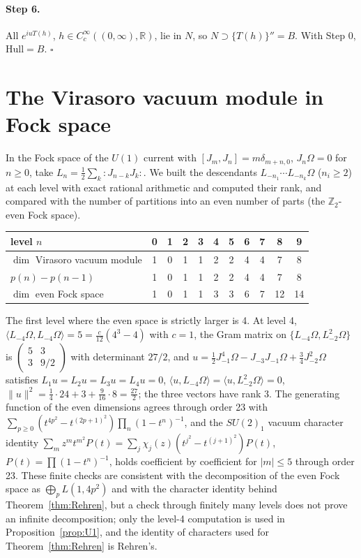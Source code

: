 \documentclass[12pt]{article}
\theoremstyle{definition}
\theoremstyle{remark}
\begin{document}
\paragraph{Step 6.} All \(e^{iuT(h)}\), \(h\in C_c^\infty((0,\infty),\mathbb R)\), lie in \(N\), so
\(N\supset\{T(h)\}''=B\). With Step 0, \(\mathrm{Hull}=B\). \(\square\)

\section{The Virasoro vacuum module in Fock space}\label{app:fock}

In the Fock space of the \(U(1)\) current with \([J_m,J_n]=m\delta_{m+n,0}\),
\(J_n\Omega=0\) for \(n\ge0\), take \(L_n=\tfrac12\sum_k{:}J_{n-k}J_k{:}\). We built the descendants \(L_{-n_1}\cdots L_{-n_k}\Omega\) (\(n_i\ge2\)) at each level with exact
rational arithmetic and computed their rank, and compared with the number of
partitions into an even number of parts (the \(\mathbb Z_2\)-even Fock space).
\begin{center}
\begin{tabular}{l|cccccccccc}
level \(n\) & 0&1&2&3&4&5&6&7&8&9\\\hline
\(\dim\) Virasoro vacuum module & 1&0&1&1&2&2&4&4&7&8\\
\(p(n)-p(n-1)\) & 1&0&1&1&2&2&4&4&7&8\\
\(\dim\) even Fock space & 1&0&1&1&3&3&6&7&12&14
\end{tabular}
\end{center}
The first level where the even space is strictly larger is 4. At level 4,
\(\langle L_{-4}\Omega,L_{-4}\Omega\rangle=5=\tfrac c{12}(4^3-4)\) with \(c=1\), the Gram
matrix on \(\{L_{-4}\Omega,L_{-2}^2\Omega\}\) is \(\left(\begin{smallmatrix}5&3\\3&9/2\end{smallmatrix}\right)\) with
determinant \(27/2\), and
\(u=\tfrac12J_{-1}^4\Omega-J_{-3}J_{-1}\Omega+\tfrac34J_{-2}^2\Omega\) satisfies
\(L_1u=L_2u=L_3u=L_4u=0\), \(\langle u,L_{-4}\Omega\rangle=\langle u,L_{-2}^2\Omega\rangle=0\),
\(\|u\|^2=\tfrac14\cdot24+3+\tfrac9{16}\cdot8=\tfrac{27}2\); the three vectors have rank
3. The generating function of the even dimensions agrees through order 23 with
\(\sum_{p\ge0}(t^{4p^2}-t^{(2p+1)^2})\prod_n(1-t^n)^{-1}\), and the \(SU(2)_1\) vacuum character
identity \(\sum_mz^mt^{m^2}P(t)=\sum_j\chi_j(z)(t^{j^2}-t^{(j+1)^2})P(t)\), \(P(t)=\prod(1-t^n)^{-1}\),
holds coefficient by coefficient for \(|m|\le5\) through order 23. These finite checks are consistent
with the decomposition of the even Fock space as \(\bigoplus_pL(1,4p^2)\) and with the character
identity behind Theorem~\ref{thm:Rehren}, but a check through finitely many levels does not prove an
infinite decomposition; only the level-4 computation is used in Proposition~\ref{prop:U1}, and the
identity of characters used for Theorem~\ref{thm:Rehren} is Rehren's.
\end{document}
